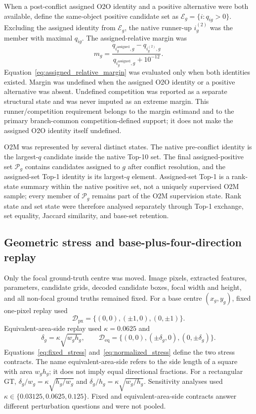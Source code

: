 When a post-conflict assigned O2O identity and a positive alternative were both available, define the same-object positive candidate set as $\mathcal E_g=\{i:q_{ig}>0\}$. Excluding the assigned identity from $\mathcal E_g$, the native runner-up $i_g^{(2)}$ was the member with maximal $q_{ig}$. The assigned-relative margin was
\begin{equation}
m_g=
\frac{q_{i_g^{\mathrm{assigned}},g}-q_{i_g^{(2)},g}}
{q_{i_g^{\mathrm{assigned}},g}+10^{-12}}.
\label{eq:assigned_relative_margin}
\end{equation}
Equation~\eqref{eq:assigned_relative_margin} was evaluated only when both identities existed.
Margin was undefined when the assigned O2O identity or a positive alternative was absent. Undefined competition was reported as a separate structural state and was never imputed as an extreme margin. This runner/competition requirement belongs to the margin estimand and to the primary branch-common competition-defined support; it does not make the assigned O2O identity itself undefined.

O2M was represented by several distinct states. The native pre-conflict identity is the largest-$q$ candidate inside the native Top-10 set. The final assigned-positive set $\mathcal P_g$ contains candidates assigned to $g$ after conflict resolution, and the assigned-set Top-1 identity is its largest-$q$ element. Assigned-set Top-1 is a rank-state summary within the native positive set, not a uniquely supervised O2M sample; every member of $\mathcal P_g$ remains part of the O2M supervision state. Rank state and set state were therefore analysed separately through Top-1 exchange, set equality, Jaccard similarity, and base-set retention.

\subsection{Geometric stress and base-plus-four-direction replay}

Only the focal ground-truth centre was moved. Image pixels, extracted features, parameters, candidate grids, decoded candidate boxes, focal width and height, and all non-focal ground truths remained fixed. For a base centre $(x_g,y_g)$, fixed one-pixel replay used
\begin{equation}
\mathcal D_{\mathrm{px}}=\{(0,0),(\pm1,0),(0,\pm1)\}.
\label{eq:fixed_stress}
\end{equation}
Equivalent-area-side replay used $\kappa=0.0625$ and
\begin{equation}
\delta_g=\kappa\sqrt{w_gh_g},\qquad
\mathcal D_{\mathrm{eq}}=\{(0,0),(\pm\delta_g,0),(0,\pm\delta_g)\}.
\label{eq:normalized_stress}
\end{equation}
Equations~\eqref{eq:fixed_stress} and~\eqref{eq:normalized_stress} define the two stress contracts. The name equivalent-area-side refers to the side length of a square with area $w_gh_g$; it does not imply equal directional fractions. For a rectangular GT, $\delta_g/w_g=\kappa\sqrt{h_g/w_g}$ and $\delta_g/h_g=\kappa\sqrt{w_g/h_g}$. Sensitivity analyses used $\kappa\in\{0.03125,0.0625,0.125\}$. Fixed and equivalent-area-side contracts answer different perturbation questions and were not pooled.

